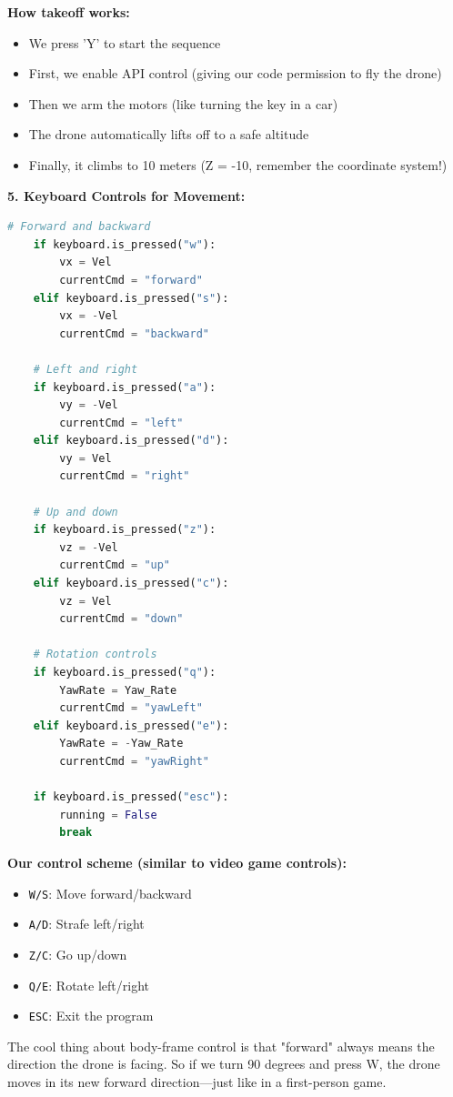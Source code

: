 \textbf{How takeoff works:}
\begin{itemize}
	\item We press 'Y' to start the sequence
	\item First, we enable API control (giving our code permission to fly the drone)
	\item Then we arm the motors (like turning the key in a car)
	\item The drone automatically lifts off to a safe altitude
	\item Finally, it climbs to 10 meters (Z = -10, remember the coordinate system!)
\end{itemize}

\textbf{5. Keyboard Controls for Movement:}
\begin{lstlisting}[language=Python]
    # Forward and backward
    if keyboard.is_pressed("w"):
        vx = Vel
        currentCmd = "forward"
    elif keyboard.is_pressed("s"):
        vx = -Vel
        currentCmd = "backward"
    
    # Left and right
    if keyboard.is_pressed("a"):
        vy = -Vel
        currentCmd = "left"
    elif keyboard.is_pressed("d"):
        vy = Vel
        currentCmd = "right"
    
    # Up and down
    if keyboard.is_pressed("z"):
        vz = -Vel
        currentCmd = "up"
    elif keyboard.is_pressed("c"):
        vz = Vel
        currentCmd = "down"
    
    # Rotation controls
    if keyboard.is_pressed("q"):
        YawRate = Yaw_Rate
        currentCmd = "yawLeft"
    elif keyboard.is_pressed("e"):
        YawRate = -Yaw_Rate
        currentCmd = "yawRight"

    if keyboard.is_pressed("esc"):
        running = False
        break
\end{lstlisting}

\textbf{Our control scheme (similar to video game controls):}
\begin{itemize}
	\item \texttt{W/S}: Move forward/backward
	\item \texttt{A/D}: Strafe left/right
	\item \texttt{Z/C}: Go up/down
	\item \texttt{Q/E}: Rotate left/right
	\item \texttt{ESC}: Exit the program
\end{itemize}

The cool thing about body-frame control is that "forward" always means the direction the drone is facing. So if we turn 90 degrees and press W, the drone moves in its new forward direction—just like in a first-person game.

